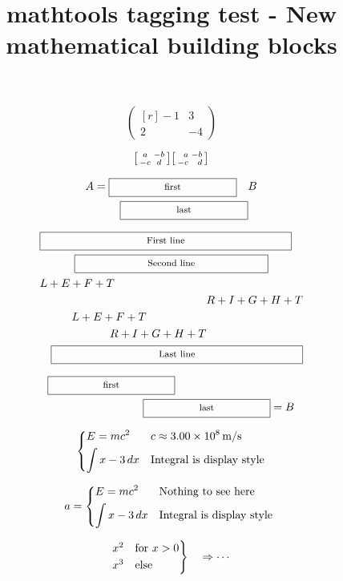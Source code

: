 \documentclass{article}
\title{mathtools tagging test - New mathematical building blocks}
\begin{document}
\[
\begin{pmatrix*}[r]
-1 & 3 \\
2 & -4
\end{pmatrix*}
\]

\[
\begin{bsmallmatrix} a & -b \\ -c & d \end{bsmallmatrix}
\begin{bsmallmatrix*}[r] a & -b \\ -c & d \end{bsmallmatrix*}
\]

\[
A = \begin{multlined}[t]
\Framebox[4cm]{first} \\
\Framebox[4cm]{last}
\end{multlined} B
\]

\[
\begin{multlined}
\Framebox[.65\columnwidth]{First line} \\
\Framebox[.5\columnwidth]{Second line} \\
\shoveleft{L+E+F+T} \\
\shoveright{R+I+G+H+T} \\
\shoveleft[1cm]{L+E+F+T} \\
\shoveright[\widthof{$R+I+G+H+T$}]{R+I+G+H+T} \\
\Framebox[.65\columnwidth]{Last line}
\end{multlined}
\]

\[
\begin{multlined}[b][7cm]
\Framebox[4cm]{first} \\
\Framebox[4cm]{last}
\end{multlined} = B
\]

\[
\begin{dcases}
E = m c^2 & c \approx 3.00\times 10^{8}\,\mathrm{m}/\mathrm{s} \\
\int x-3\, dx & \text{Integral is display style}
\end{dcases}
\]

\[
a= \begin{dcases*}
E = m c^2 & Nothing to see here \\
\int x-3\, dx & Integral is display style
\end{dcases*}
\]

\[
\begin{rcases*}
x^2 & for $x>0$\\
x^3 & else
\end{rcases*} \quad \Rightarrow \cdots
\]
\end{document}
